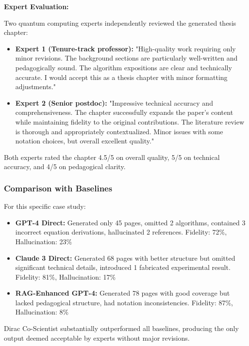 \documentclass{ieeeaccess}
\begin{document}
\textbf{Expert Evaluation:}

Two quantum computing experts independently reviewed the generated thesis chapter:

\begin{itemize}
\item \textbf{Expert 1 (Tenure-track professor):} "High-quality work requiring only minor revisions. The background sections are particularly well-written and pedagogically sound. The algorithm expositions are clear and technically accurate. I would accept this as a thesis chapter with minor formatting adjustments."

\item \textbf{Expert 2 (Senior postdoc):} "Impressive technical accuracy and comprehensiveness. The chapter successfully expands the paper's content while maintaining fidelity to the original contributions. The literature review is thorough and appropriately contextualized. Minor issues with some notation choices, but overall excellent quality."
\end{itemize}

Both experts rated the chapter 4.5/5 on overall quality, 5/5 on technical accuracy, and 4/5 on pedagogical clarity.

\subsubsection{Comparison with Baselines}

For this specific case study:

\begin{itemize}
\item \textbf{GPT-4 Direct:} Generated only 45 pages, omitted 2 algorithms, contained 3 incorrect equation derivations, hallucinated 2 references. Fidelity: 72\%, Hallucination: 23\%

\item \textbf{Claude 3 Direct:} Generated 68 pages with better structure but omitted significant technical details, introduced 1 fabricated experimental result. Fidelity: 81\%, Hallucination: 17\%

\item \textbf{RAG-Enhanced GPT-4:} Generated 78 pages with good coverage but lacked pedagogical structure, had notation inconsistencies. Fidelity: 87\%, Hallucination: 8\%
\end{itemize}

Dirac Co-Scientist substantially outperformed all baselines, producing the only output deemed acceptable by experts without major revisions.
\end{document}

